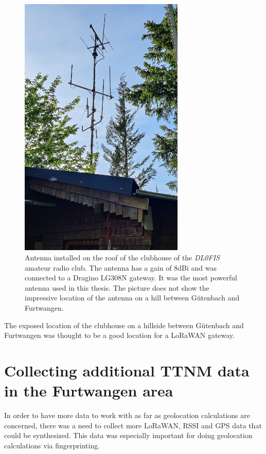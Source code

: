 \begin{figure}
    \centering
    \includegraphics[width=0.7\textwidth]{pictures/hardware/gateway-deployment/gateway_dl0fis_clubhouse.jpg}
    \caption{
        Antenna installed on the roof of the clubhouse of the \emph{DL0FIS} amateur radio club.
        The antenna has a gain of 8dBi and was connected to a Dragino LG308N gateway.
        It was the most powerful antenna used in this thesis.
        The picture does not show the impressive location of the antenna on a hill between Gütenbach and Furtwangen.
    }\label{pic:antenna-dl0fis-clubhouse}
\end{figure}

The exposed location of the clubhouse on a hillside between Gütenbach and Furtwangen was thought to be a good location for a \ac{LoRaWAN} gateway.

\section{Collecting additional \acf{TTNM} data in the Furtwangen area}\label{sec:collecting-additional-ttnm-data}

In order to have more data to work with as far as geolocation calculations are concerned, there was a need to collect more \ac{LoRaWAN}, \ac{RSSI} and \ac{GPS} data that could be synthesized.
This data was especially important for doing geolocation calculations via fingerprinting.

